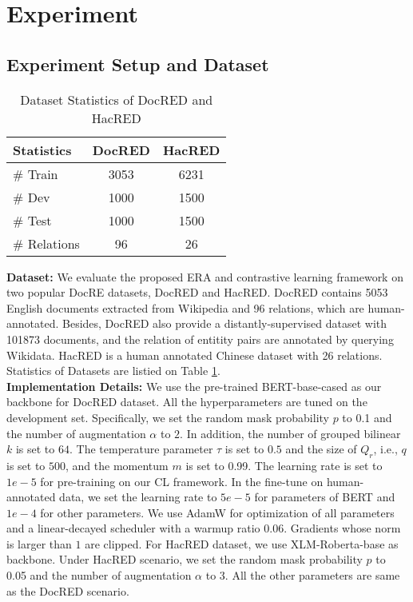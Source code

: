 \documentclass[11pt]{article}
\begin{document}
\section{Experiment}
\subsection{Experiment Setup and Dataset}
   \begin{table}[h]
        \centering
        \begin{tabular}{lcc}
            \toprule

            Statistics & DocRED & HacRED \\
            \midrule
            \# Train & 3053 &6231 \\
            \# Dev &1000 &1500 \\
            \# Test &1000 &1500 \\
            \# Relations &96 &26 \\
            \toprule
        \end{tabular}
        \caption{Dataset Statistics of DocRED and HacRED}
          \label{tb:data-stat}
    \end{table}
    
    \textbf{Dataset:}
   We evaluate the proposed ERA and contrastive learning framework on two popular DocRE datasets, DocRED\citep{yao-etal-2019-docred} and HacRED\citep{cheng-etal-2021-hacred}. DocRED contains 5053 English documents extracted from Wikipedia and 96 relations, which are human-annotated. Besides, DocRED also provide a distantly-supervised dataset with 101873 documents, and the relation of entitity pairs are annotated by querying Wikidata. HacRED is a human annotated Chinese dataset with 26 relations. Statistics of Datasets are listied on Table \ref{tb:data-stat}.  \\
    \textbf{Implementation Details:} We use the pre-trained BERT-base-cased\citep{devlin-etal-2019-bert} as our backbone for DocRED dataset. All the hyperparameters are tuned on the development set. Specifically, we set the random mask probability $p$ to 0.1 and the number of augmentation $\alpha$ to $2$. In addition, the number of grouped bilinear $k$ is set to $64$. The temperature parameter $\tau$ is set to $0.5$ and the size of $Q_r$, i.e., $q$ is set to $500$, and the momentum $m$ is set to 0.99. The learning rate is set to $1e-5$ for pre-training on our CL framework. In the fine-tune on human-annotated data, we set the learning rate to $5e-5$ for parameters of BERT and $1e-4$ for other parameters. We use AdamW\citep{losch_adamw_2019} for optimization of all parameters and a linear-decayed scheduler with a warmup ratio $0.06$. Gradients whose norm is larger than $1$ are clipped. For HacRED dataset, we use XLM-Roberta-base\citep{conneau-etal-2020-unsupervised} as backbone. Under HacRED scenario, we set the random mask probability $p$ to 0.05 and the number of augmentation $\alpha$ to $3$. All the other parameters are same as the DocRED scenario. 
    
\end{document}
